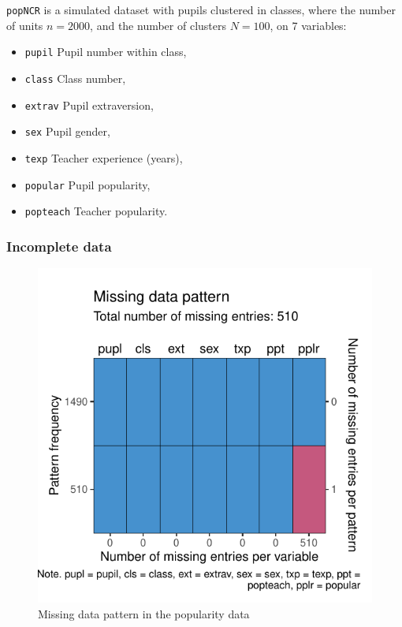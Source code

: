 \documentclass[
]{jss}
\providecommand{\tightlist}{%
  \setlength{\itemsep}{0pt}\setlength{\parskip}{0pt}}
\begin{document}
\texttt{popNCR} is a simulated dataset with pupils clustered in classes,
where the number of units \(n = 2000\), and the number of clusters
\(N = 100\), on 7 variables:

\begin{itemize}
\tightlist
\item
  \texttt{pupil} Pupil number within class,
\item
  \texttt{class} Class number,
\item
  \texttt{extrav} Pupil extraversion,
\item
  \texttt{sex} Pupil gender,
\item
  \texttt{texp} Teacher experience (years),
\item
  \texttt{popular} Pupil popularity,
\item
  \texttt{popteach} Teacher popularity.
\end{itemize}

\hypertarget{incomplete-data}{%
\subsubsection{Incomplete data}\label{incomplete-data}}

\begin{CodeChunk}
\begin{figure}

{\centering \includegraphics{Manuscript_files/figure-latex/pop_pat-1} 

}

\caption[Missing data pattern in the popularity data]{Missing data pattern in the popularity data}\label{fig:pop_pat}
\end{figure}
\end{CodeChunk}
\end{document}
